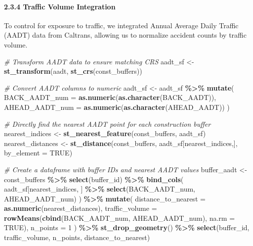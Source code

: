 \documentclass[
]{article}
\newenvironment{Shaded}{\begin{snugshade}}{\end{snugshade}}
\newcommand{\AttributeTok}[1]{\textcolor[rgb]{0.13,0.29,0.53}{#1}}
\newcommand{\CommentTok}[1]{\textcolor[rgb]{0.56,0.35,0.01}{\textit{#1}}}
\newcommand{\ConstantTok}[1]{\textcolor[rgb]{0.56,0.35,0.01}{#1}}
\newcommand{\DecValTok}[1]{\textcolor[rgb]{0.00,0.00,0.81}{#1}}
\newcommand{\FunctionTok}[1]{\textcolor[rgb]{0.13,0.29,0.53}{\textbf{#1}}}
\newcommand{\NormalTok}[1]{#1}
\newcommand{\OtherTok}[1]{\textcolor[rgb]{0.56,0.35,0.01}{#1}}
\newcommand{\SpecialCharTok}[1]{\textcolor[rgb]{0.81,0.36,0.00}{\textbf{#1}}}
\begin{document}
\paragraph{2.3.4 Traffic Volume
Integration}\label{traffic-volume-integration}

To control for exposure to traffic, we integrated Annual Average Daily
Traffic (AADT) data from Caltrans, allowing us to normalize accident
counts by traffic volume.

\begin{Shaded}
\begin{Highlighting}[]
\CommentTok{\# Transform AADT data to ensure matching CRS}
\NormalTok{aadt\_sf }\OtherTok{\textless{}{-}} \FunctionTok{st\_transform}\NormalTok{(aadt, }\FunctionTok{st\_crs}\NormalTok{(const\_buffers))}

\CommentTok{\# Convert AADT columns to numeric}
\NormalTok{aadt\_sf }\OtherTok{\textless{}{-}}\NormalTok{ aadt\_sf }\SpecialCharTok{\%\textgreater{}\%}
  \FunctionTok{mutate}\NormalTok{(}
    \AttributeTok{BACK\_AADT\_num =} \FunctionTok{as.numeric}\NormalTok{(}\FunctionTok{as.character}\NormalTok{(BACK\_AADT)),}
    \AttributeTok{AHEAD\_AADT\_num =} \FunctionTok{as.numeric}\NormalTok{(}\FunctionTok{as.character}\NormalTok{(AHEAD\_AADT))}
\NormalTok{  )}

\CommentTok{\# Directly find the nearest AADT point for each construction buffer}
\NormalTok{nearest\_indices }\OtherTok{\textless{}{-}} \FunctionTok{st\_nearest\_feature}\NormalTok{(const\_buffers, aadt\_sf)}
\NormalTok{nearest\_distances }\OtherTok{\textless{}{-}} \FunctionTok{st\_distance}\NormalTok{(const\_buffers, aadt\_sf[nearest\_indices,], }\AttributeTok{by\_element =} \ConstantTok{TRUE}\NormalTok{)}

\CommentTok{\# Create a dataframe with buffer IDs and nearest AADT values}
\NormalTok{buffer\_aadt }\OtherTok{\textless{}{-}}\NormalTok{ const\_buffers }\SpecialCharTok{\%\textgreater{}\%}
  \FunctionTok{select}\NormalTok{(buffer\_id) }\SpecialCharTok{\%\textgreater{}\%}
  \FunctionTok{bind\_cols}\NormalTok{(}
\NormalTok{    aadt\_sf[nearest\_indices, ] }\SpecialCharTok{\%\textgreater{}\%}
    \FunctionTok{select}\NormalTok{(BACK\_AADT\_num, AHEAD\_AADT\_num)}
\NormalTok{  ) }\SpecialCharTok{\%\textgreater{}\%}
  \FunctionTok{mutate}\NormalTok{(}
    \AttributeTok{distance\_to\_nearest =} \FunctionTok{as.numeric}\NormalTok{(nearest\_distances),}
    \AttributeTok{traffic\_volume =} \FunctionTok{rowMeans}\NormalTok{(}\FunctionTok{cbind}\NormalTok{(BACK\_AADT\_num, AHEAD\_AADT\_num), }\AttributeTok{na.rm =} \ConstantTok{TRUE}\NormalTok{),}
    \AttributeTok{n\_points =} \DecValTok{1}
\NormalTok{  ) }\SpecialCharTok{\%\textgreater{}\%}
  \FunctionTok{st\_drop\_geometry}\NormalTok{() }\SpecialCharTok{\%\textgreater{}\%}
  \FunctionTok{select}\NormalTok{(buffer\_id, traffic\_volume, n\_points, distance\_to\_nearest)}


\end{Highlighting}
\end{Shaded}
\end{document}
